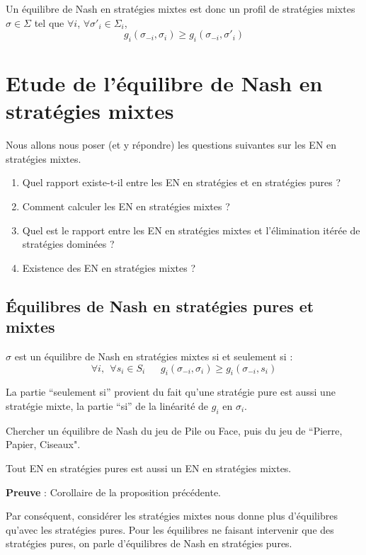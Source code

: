 Un équilibre de Nash en stratégies mixtes est donc un profil de
strat\'egies mixtes $\sigma\in\Sigma$ tel que $\forall i$,
$\forall \sigma'_i\in \Sigma_i$,
$$
g_i(\sigma_{-i},\sigma_{i})\geq g_i(\sigma_{-i},\sigma'_{i})
$$

\section{Etude de l'équilibre de Nash en stratégies mixtes}
Nous allons nous poser (et y répondre) les questions suivantes sur
les EN en stratégies mixtes.\\%
\begin{enumerate}
\item Quel rapport existe-t-il entre les EN en stratégies et en stratégies pures ? %
\item Comment calculer les EN en stratégies mixtes ? %
\item Quel est le rapport entre les EN en stratégies mixtes et l'élimination itérée de stratégies dominées ?%
\item Existence des EN en stratégies mixtes ?
\end{enumerate}%

\subsection{Équilibres de Nash en stratégies pures et mixtes}

\begin{proposition} $\sigma$ est un \'equilibre de Nash en
strat\'egies mixtes si et seulement si :
$$
\forall i,~~\forall s_i\in S_i~~~~~~~
g_i(\sigma_{-i},\sigma_{i})\geq g_i(\sigma_{-i},s_{i})
$$
\end{proposition} La partie ``seulement si'' provient du fait
qu'une strat\'egie pure est aussi une strat\'egie mixte, la partie
``si'' de la lin\'earit\'e de $g_i$ en $\sigma_i$.

\begin{exemple} Chercher un \'equilibre de Nash du jeu de Pile ou Face, puis
du jeu de ``Pierre, Papier, Ciseaux". %
\end{exemple}

\begin{proposition} Tout EN en strat\'egies pures est aussi un EN
en strat\'egies mixtes.
\end{proposition}
{\bf Preuve }: Corollaire de la proposition pr\'ec\'edente.

Par conséquent, considérer les stratégies mixtes nous donne plus
d'équilibres qu'avec les stratégies pures. Pour les équilibres ne
faisant intervenir que des stratégies pures, on parle d'équilibres
de Nash en stratégies pures.

